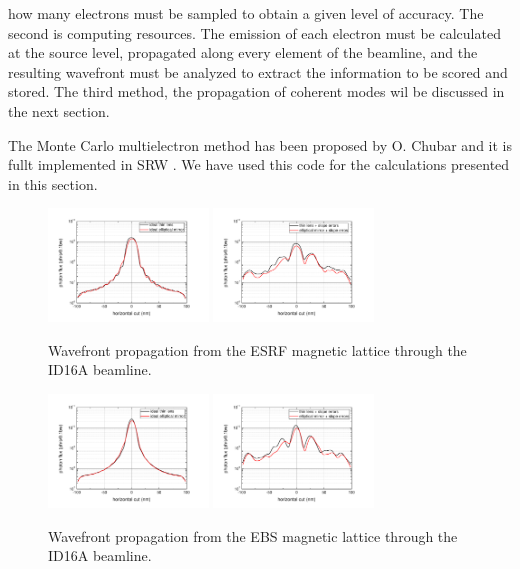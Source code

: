 \documentclass{iucr}              %
\begin{document}
how many electrons must be sampled to obtain a given level of accuracy. The second is computing resources. The emission of each electron must be calculated at the source level, propagated along every element of the beamline, and the resulting wavefront must be analyzed to extract the information to be scored and stored. The third method, the propagation of coherent modes wil be discussed in the next section. 

The Monte Carlo multielectron method has been proposed by O. Chubar and it is fullt implemented in SRW \cite{codeSRW}. We have used this code for the calculations presented in this section.  

\begin{figure}
    \centering
        \includegraphics[width=4.25cm]{GRAPHICS/esrf_idealTE_idealOE_h.pdf}
        \includegraphics[width=4.25cm]{GRAPHICS/esrf_slopeTE_slopeOE_h.pdf}
    \label{fig:FiniteEmittanceA}
    \caption{Wavefront propagation from the ESRF magnetic lattice through the ID16A beamline.}
\end{figure}

\begin{figure}
    \centering
        \includegraphics[width=4.25cm]{GRAPHICS/ebs_idealTE_idealOE_h.pdf}
        \includegraphics[width=4.25cm]{GRAPHICS/ebs_slopeTE_slopeOE_h.pdf}
    \label{fig:FiniteEmittanceB}
    \caption{Wavefront propagation from the EBS magnetic lattice through the ID16A beamline.}
\end{figure}
\end{document}
